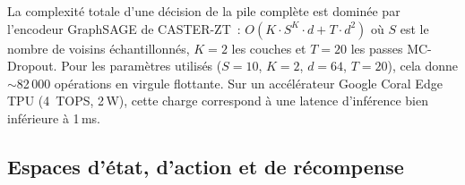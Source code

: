 \begin{table}[htbp]
\centering
\caption{Analyse de complexité algorithmique des composants principaux. $n$~: n\oe{}uds, $|E|$~: arêtes, $d$~: dimension des plongements, $K$~: couches GNN, $T$~: passes MC-Dropout.}
\label{tab:complexity}
\end{table}

\noindent La complexité totale d'une décision de la pile complète est dominée par l'encodeur GraphSAGE de CASTER-ZT~: $O(K \cdot S^K \cdot d + T \cdot d^2)$ où $S$ est le nombre de voisins échantillonnés, $K = 2$ les couches et $T = 20$ les passes MC-Dropout. Pour les paramètres utilisés ($S = 10$, $K = 2$, $d = 64$, $T = 20$), cela donne $\sim$82\,000 opérations en virgule flottante. Sur un accélérateur Google Coral Edge TPU (4~TOPS, 2\,W), cette charge correspond à une latence d'inférence bien inférieure à 1\,ms.


\subsection{Espaces d'état, d'action et de récompense}

